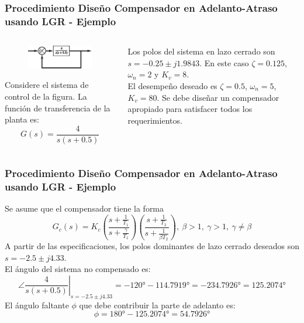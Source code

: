 \documentclass[aspectratio=169,handout]{beamer}
\theoremstyle{definition}
\theoremstyle{plain}
\theoremstyle{remark}
\begin{document}
\begin{frame}[<+->]\frametitle{Procedimiento Diseño Compensador en Adelanto-Atraso usando LGR - Ejemplo}
\begin{columns}
	\begin{column}{0.5\textwidth}
		\begin{figure}
			\includegraphics[width=4cm]{images/ejemplo3_planta.eps}
		\end{figure}
		Considere el sistema de control de la figura. La función de transferencia de la planta es:
		\begin{equation*}
			G(s) = \frac{4}{s(s+0.5)}
		\end{equation*}
	\end{column}
	\begin{column}{0.5\textwidth}
		Los polos del sistema en lazo cerrado son $s = -0.25 \pm j1.9843$. En este caso $\zeta = 0.125$, $\omega_n = 2$ y $K_v = 8$.\\
		\vspace*{3mm}
		\pause
		El desempeño deseado es $\zeta = 0.5$, $\omega_n = 5$, $K_v = 80$. Se debe diseñar un compensador apropiado para satisfacer todos los requerimientos.
	\end{column}
\end{columns}
\end{frame}

\begin{frame}[<+->]\frametitle{Procedimiento Diseño Compensador en Adelanto-Atraso usando LGR - Ejemplo}
	Se asume que el compensador tiene la forma
	\begin{equation*}
		G_c(s) = K_c \left( \frac{s+\frac{1}{T_1}}{s+\frac{\gamma}{T_1}} \right)\left( \frac{s+\frac{1}{T_2}}{s+\frac{1}{\beta T_2}} \right),\ \beta > 1,\ \gamma > 1,\ \gamma \neq \beta
	\end{equation*}
	\pause
	A partir de las especificaciones, los polos dominantes de lazo cerrado deseados son $s = -2.5 \pm j4.33$.\\
	\vspace*{3mm}
	\pause
	El ángulo del sistema no compensado es:	
	\begin{equation*}
		\angle\left.\frac{4}{s(s+0.5)}\right|_{s=-2.5 \pm j4.33} = -\ang{120} -\ang{114.7919} = -\ang{234.7926} = \ang{125.2074}
	\end{equation*}
	\pause
	El ángulo faltante $\phi$ que debe contribuir la parte de adelanto es:
	\begin{equation*}
		\phi = \ang{180} - \ang{125.2074} = \ang{54.7926}
	\end{equation*}
\end{frame}
\end{document}
